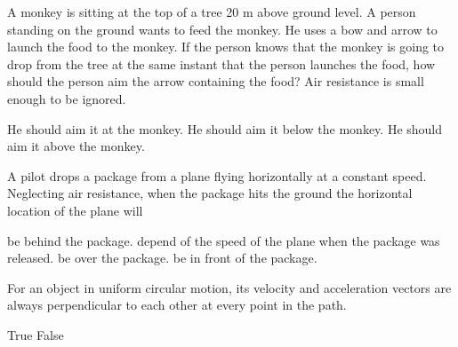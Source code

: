 \documentclass[11pt]{exam}
\begin{document}
\begin{questions}

\question
\iftoggle{hideans}{\underline{~~~~~~~~~~~}}{\underline{~~~~~A~~~~~}}
A monkey is sitting at the top of a tree 20 m above ground level. A person standing on the ground wants to feed the monkey. He uses a bow and arrow to launch the food to the monkey. If the person knows that the monkey is going to drop from the tree at the same instant that the person launches the food, how should the person aim the arrow containing the food? Air resistance is small enough to be ignored.
\begin{choices}
   \choice He should aim it at the monkey.
   \choice He should aim it below the monkey.
   \choice He should aim it above the monkey.
\end{choices}

\question
\iftoggle{hideans}{\underline{~~~~~~~~~~~}}{\underline{~~~~~C~~~~~}}
A pilot drops a package from a plane flying horizontally at a constant speed. Neglecting air resistance, when the package hits the ground the horizontal location of the plane will
\begin{choices}
   \choice be behind the package.
   \choice depend of the speed of the plane when the package was released.
   \choice be over the package.
   \choice be in front of the package.
\end{choices}

\question
\iftoggle{hideans}{\underline{~~~~~~~~~~~}}{\underline{~~~~~A~~~~~}}
For an object in uniform circular motion, its velocity and acceleration vectors are always perpendicular to each other at every point in the path.
\begin{choices}
   \choice True
   \choice False
\end{choices}




\end{questions}
\end{document}
